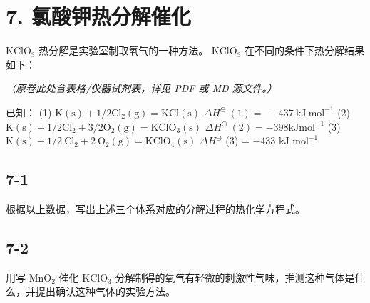 \section*{7. 氯酸钾热分解催化}
$\mathrm { K C l O _ { 3 } }$ 热分解是实验室制取氧⽓的⼀种⽅法。 $\mathrm { K C l O _ { 3 } }$ 在不同的条件下热分解结果如下：

\textit{（原卷此处含表格/仪器试剂表，详见 PDF 或 MD 源文件。）}

已知： (1) $\mathrm { K } ( \mathrm { s } ) + 1 / 2 \mathrm { C l } _ { 2 } ( \mathrm { g } ) = \mathrm { K C l } ( \mathrm { s } )$ $\Delta H ^ { \ominus } \ ( 1 ) = \ - 4 3 7 \ \mathrm { k J \ m o l ^ { - 1 } }$ (2) $\mathrm { K ( s ) } + 1 / 2 \mathrm { C l } _ { 2 } + 3 / 2 \mathrm { O } _ { 2 } ( \mathrm { g } ) = \mathrm { K C l } \mathrm { O } _ { 3 } ( \mathrm { s } )$ $\Delta H ^ { \ominus } \ ( 2 ) = \mathrm { - } 3 9 8 \mathrm { k J m o l ^ { - 1 } }$ (3) $\mathrm { K ( s ) + 1 / 2 \ C l _ { 2 } + 2 \ O _ { 2 } ( g ) = K C l O _ { 4 } ( s ) }$ $\Delta H ^ { \ominus }$ (3) = −433 kJ $\mathrm { m o l ^ { - 1 } }$

\subsection*{7-1}
根据以上数据，写出上述三个体系对应的分解过程的热化学⽅程式。

\subsection*{7-2}
⽤写 $\mathrm { M n O _ { 2 } }$ 催化 $\mathrm { K C l O _ { 3 } }$ 分解制得的氧⽓有轻微的刺激性⽓味，推测这种⽓体是什么，并提出确认这种⽓体的实验⽅法。
